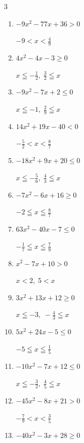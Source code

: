 \begin{multicols}{3}
\begin{enumerate}
  \item $-9x^{2}-77x+36>0$

        $\displaystyle -9 < x < \frac{4}{9}$

  \item $4x^{2}-4x-3\geq 0$

        $\displaystyle x \leqq -\frac{1}{2} , \; \frac{3}{2} \leqq x$

  \item $-9x^{2}-7x+2\leq 0$

        $\displaystyle x \leqq -1 , \; \frac{2}{9} \leqq x$

  \item $14x^{2}+19x-40<0$

        $\displaystyle -\frac{5}{2} < x < \frac{8}{7}$

\columnbreak %

  \item $-18x^{2}+9x+20\leq 0$

        $\displaystyle x \leqq -\frac{5}{6} , \; \frac{4}{3} \leqq x$

  \item $-7x^{2}-6x+16\geq 0$

        $\displaystyle -2 \leqq x \leqq \frac{8}{7}$

  \item $63x^{2}-40x-7\leq 0$

        $\displaystyle -\frac{1}{7} \leqq x \leqq \frac{7}{9}$

  \item $x^{2}-7x+10>0$

        $\displaystyle x < 2 , \; 5 < x$

  \item $3x^{2}+13x+12\geq 0$

        $\displaystyle x \leqq -3 , \; -\frac{4}{3} \leqq x$

  \item $5x^{2}+24x-5\leq 0$

        $\displaystyle -5 \leqq x \leqq \frac{1}{5}$

  \item $-10x^{2}-7x+12\leq 0$

        $\displaystyle x \leqq -\frac{3}{2} , \; \frac{4}{5} \leqq x$

  \item $-45x^{2}-8x+21>0$

        $\displaystyle -\frac{7}{9} < x < \frac{3}{5}$

  \item $-40x^{2}-3x+28\geq 0$


\end{enumerate}
\end{multicols}
